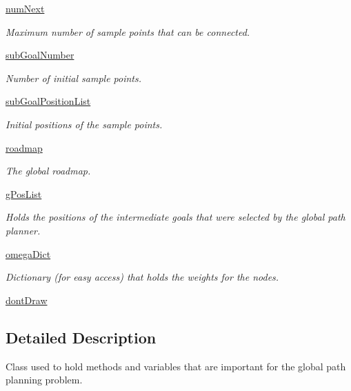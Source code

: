\begin{DoxyCompactItemize}
\hyperlink{classprm_1_1PRMGenerator_a84795d8a1191caae0612ac645d8853b9}{num\-Next}
\begin{DoxyCompactList}\small\item\em Maximum number of sample points that can be connected. \end{DoxyCompactList}\item 
\hyperlink{classprm_1_1PRMGenerator_af8d162e83184c5493019e868e53fcefd}{sub\-Goal\-Number}
\begin{DoxyCompactList}\small\item\em Number of initial sample points. \end{DoxyCompactList}\item 
\hyperlink{classprm_1_1PRMGenerator_a6c5a8c95cfb4636e37404d2f2dce78f8}{sub\-Goal\-Position\-List}
\begin{DoxyCompactList}\small\item\em Initial positions of the sample points. \end{DoxyCompactList}\item 
\hyperlink{classprm_1_1PRMGenerator_a7fa851696426c3e1bbd7ff737cf33538}{roadmap}
\begin{DoxyCompactList}\small\item\em The global roadmap. \end{DoxyCompactList}\item 
\hyperlink{classprm_1_1PRMGenerator_a164c6ae962a75ed31d58eff1db95f141}{g\-Pos\-List}
\begin{DoxyCompactList}\small\item\em Holds the positions of the intermediate goals that were selected by the global path planner. \end{DoxyCompactList}\item 
\hyperlink{classprm_1_1PRMGenerator_ad56b6bb5da1e474ab8a8099863207de3}{omega\-Dict}
\begin{DoxyCompactList}\small\item\em Dictionary (for easy access) that holds the weights for the nodes. \end{DoxyCompactList}\item 
\hyperlink{classprm_1_1PRMGenerator_a6a92750aa0e081cc87c64e157b0ecb53}{dont\-Draw}
\end{DoxyCompactItemize}


\subsection{Detailed Description}
Class used to hold methods and variables that are important for the global path planning problem. 

